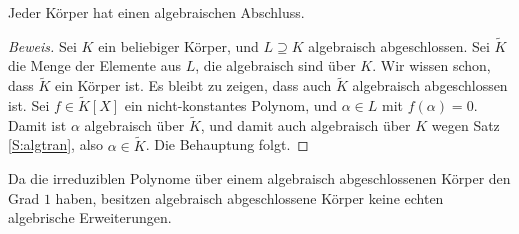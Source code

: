 \documentclass[12pt,a4paper,twoside]{article}
\begin{document}
\begin{Satz}
  Jeder K\"orper hat einen algebraischen Abschluss.
\end{Satz}
\begin{proof}[Beweis]
  Sei $K$ ein beliebiger K\"orper, und $L\supseteq K$ algebraisch
  abgeschlossen. Sei $\tilde K$ die Menge der Elemente aus $L$, die
  algebraisch sind \"uber $K$. Wir wissen schon, dass $\tilde K$ ein K\"orper
  ist. Es bleibt zu zeigen, dass auch $\tilde K$ algebraisch abgeschlossen ist.
  Sei $f\in\tilde K[X]$ ein nicht-konstantes Polynom, und $\alpha\in L$ mit
  $f(\alpha)=0$. Damit ist $\alpha$ algebraisch \"uber $\tilde K$, und damit
  auch algebraisch \"uber $K$ wegen Satz \ref{S:algtran}, also
  $\alpha\in\tilde K$. Die Behauptung folgt.
\end{proof}
\begin{Bemerkung*}
Da die irreduziblen Polynome \"uber einem algebraisch abgeschlossenen K\"orper
den Grad $1$ haben, besitzen algebraisch abgeschlossene K\"orper keine echten
algebrische Erweiterungen.
\end{Bemerkung*}
\end{document}
